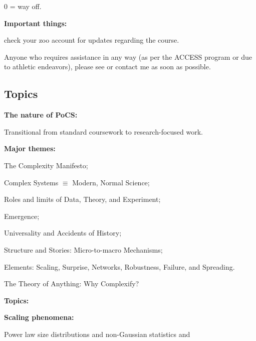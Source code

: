       0 = way off.
    

  




  \textbf{Important things:}

  
    \importantdates
  

  
     check your zoo account for updates regarding the course.
  

  
     Anyone who requires assistance in any way 
    (as per the ACCESS program
    or due to athletic endeavors), please see or contact me as soon as possible.
  



\subsection{Topics}


  \textbf{The nature of PoCS:}
    
    
      Transitional from standard coursework to research-focused work.
      {}
    
  

  \textbf{Major themes:}
    
     
      The Complexity Manifesto;
     
      Complex Systems $\equiv$ Modern, Normal Science;
    
      Roles and limits of Data, Theory, and Experiment;
    
      Emergence;
    
      Universality and Accidents of History;
     
      Structure and Stories: Micro-to-macro Mechanisms;
    
      Elements: 
      Scaling, Surprise, Networks, 
      Robustness, Failure,
      and
      Spreading.
     
      The Theory of Anything: Why Complexify?
    
  





  \textbf{Topics:}
  
  \textbf{Scaling phenomena:}
    
     
      Power law size distributions and non-Gaussian statistics and 
     
